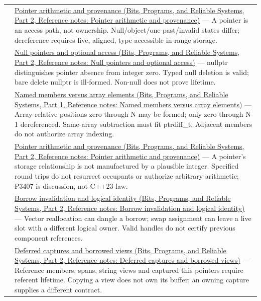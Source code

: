 {\begin{longtable}[]{@{}
  >{\raggedright\arraybackslash}p{}
  >{\raggedright\arraybackslash}p{}@{}}
117 & \href{../01-Bits-Programs-and-Reliable-Systems-P02/main.pdf\#appendix-6af5921bc853}{Pointer arithmetic and provenance (Bits, Programs, and Reliable Systems, Part 2, Reference notes: Pointer arithmetic and provenance)} --- A pointer is an access path, not ownership. Null/object/one-past/invalid states differ; dereference requires live, aligned, type-accessible in-range storage. \\
118 & \href{../01-Bits-Programs-and-Reliable-Systems-P02/main.pdf\#appendix-afae48c31800}{Null pointers and optional access (Bits, Programs, and Reliable Systems, Part 2, Reference notes: Null pointers and optional access)} --- nullptr distinguishes pointer absence from integer zero. Typed null deletion is valid; bare delete nullptr is ill-formed. Non-null does not prove lifetime. \\
119 & \href{../01-Bits-Programs-and-Reliable-Systems-P01/main.pdf\#appendix-3f7e15effba6}{Named members versus array elements (Bits, Programs, and Reliable Systems, Part 1, Reference notes: Named members versus array elements)} --- Array-relative positions zero through N may be formed; only zero through N-1 dereferenced. Same-array subtraction must fit ptrdiff\_t. Adjacent members do not authorize array indexing. \\
120 & \href{../01-Bits-Programs-and-Reliable-Systems-P02/main.pdf\#appendix-6af5921bc853}{Pointer arithmetic and provenance (Bits, Programs, and Reliable Systems, Part 2, Reference notes: Pointer arithmetic and provenance)} --- A pointer's storage relationship is not manufactured by a plausible integer. Specified round trips do not resurrect occupants or authorize arbitrary arithmetic; P3407 is discussion, not C++23 law. \\
121 & \href{../01-Bits-Programs-and-Reliable-Systems-P02/main.pdf\#appendix-f9b8b9188c7f}{Borrow invalidation and logical identity (Bits, Programs, and Reliable Systems, Part 2, Reference notes: Borrow invalidation and logical identity)} --- Vector reallocation can dangle a borrow; swap assignment can leave a live slot with a different logical owner. Valid handles do not certify previous component references. \\
122 & \href{../01-Bits-Programs-and-Reliable-Systems-P02/main.pdf\#appendix-aea529eb5175}{Deferred captures and borrowed views (Bits, Programs, and Reliable Systems, Part 2, Reference notes: Deferred captures and borrowed views)} --- Reference members, spans, string views and captured this pointers require referent lifetime. Copying a view does not own its buffer; an owning capture supplies a different contract. \\

\end{longtable}}
